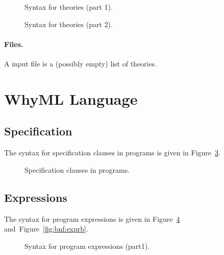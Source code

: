\begin{figure}
  \begin{center}\framebox{}\end{center}
  \caption{Syntax for theories (part 1).}
\label{fig:bnf:theorya}
\end{figure}

\begin{figure}
  \begin{center}\framebox{}\end{center}
  \caption{Syntax for theories (part 2).}
\label{fig:bnf:theoryb}
\end{figure}

\paragraph{Files.}
A \why input file is a (possibly empty) list of theories.
\begin{center}\framebox{}\end{center}


\clearpage
\section{WhyML Language}\label{sec:syntax:whyml}

\subsection{Specification}

The syntax for specification clauses in programs 
is given in Figure~\ref{fig:bnf:spec}.
\begin{figure}
  \begin{center}\framebox{}\end{center}
  \caption{Specification clauses in programs.}
\label{fig:bnf:spec}
\end{figure}

\subsection{Expressions}

The syntax for program expressions is given in
Figure~\ref{fig:bnf:expra} and~Figure~\ref{fig:bnf:exprb}.
\begin{figure}
  \begin{center}\framebox{}\end{center}
  \caption{Syntax for program expressions (part1).}
\label{fig:bnf:expra}
\end{figure}

